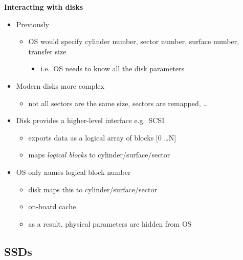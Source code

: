 \documentclass[11pt,a4paper]{article}
\begin{document}
\textbf{Interacting with disks}
\begin{itemize}
    \item Previously
        \begin{itemize}
            \item OS would specify cylinder number, sector number, surface number, transfer size
                \begin{itemize}
                    \item i.e.\ OS needs to know all the disk parameters
                \end{itemize}
        \end{itemize}
    \item Modern disks more complex
        \begin{itemize}
            \item not all sectors are the same size, sectors are remapped, \dots
        \end{itemize}
    \item Disk provides a higher-level interface e.g.\ SCSI
        \begin{itemize}
            \item exports data as a logical array of blocks [0 \dots N]
            \item maps \emph{logical blocks} to cylinder/surface/sector
        \end{itemize}
    \item OS only names logical block number
        \begin{itemize}
            \item  disk maps this to cylinder/surface/sector
            \item on-board cache
            \item as a result, physical parameters are hidden from OS
        \end{itemize}
\end{itemize}

\subsection{SSDs}
\end{document}
